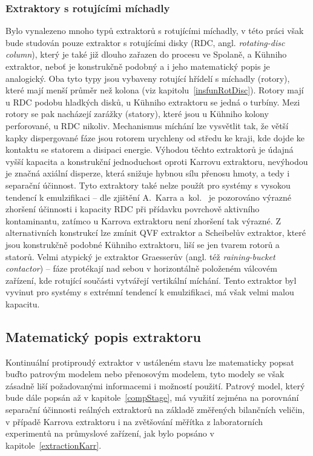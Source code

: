 \subsubsection{Extraktory s rotujícími míchadly} \label{extractionRotDisc}
Bylo vynalezeno mnoho typů extraktorů s rotujícími míchadly, v této práci však bude studován pouze extraktor s rotujícími disky (RDC, angl. \textit{rotating-disc column}), který je také již dlouho zařazen do procesu ve Spolaně, a Kühniho extraktor, neboť je konstrukčně podobný a i jeho matematický popis je analogický.
Oba tyto typy jsou vybaveny rotující hřídelí s míchadly (rotory), které mají menší průměr než kolona (viz kapitolu~\ref{insfunRotDisc}).
Rotory mají u RDC podobu hladkých disků, u Kühniho extraktoru se jedná o turbíny.
Mezi rotory se pak nacházejí zarážky (statory), které jsou u Kühniho kolony perforované, u RDC nikoliv.
Mechanismus míchání lze vysvětlit tak, že větší kapky dispergované fáze jsou rotorem urychleny od středu ke kraji, kde dojde ke kontaktu se statorem a disipaci energie.
Výhodou těchto extraktorů je údajná vyšší kapacita a konstrukční jednoduchost oproti Karrovu extraktoru, nevýhodou je značná axiální disperze, která snižuje hybnou sílu přenosu hmoty, a tedy i separační účinnost.
Tyto extraktory také nelze použít pro systémy s vysokou tendencí k emulzifikaci -- dle zjištění A.~Karra a~kol.~\cite{Karr1990} je pozorováno výrazné zhoršení účinnosti i kapacity RDC při přídavku povrchově aktivního kontaminantu, zatímco u Karrova extraktoru není zhoršení tak výrazné.
Z alternativních konstrukcí lze zmínit QVF extraktor a Scheibelův extraktor, které jsou konstrukčně podobné Kühniho extraktoru, liší se jen tvarem rotorů a statorů.
Velmi atypický je extraktor Graesserův (angl. též \textit{raining-bucket contactor}) -- fáze protékají nad sebou v horizontálně položeném válcovém zařízení, kde rotující součásti vytvářejí vertikální míchání.
Tento extraktor byl vyvinut pro systémy s extrémní tendencí k emulzifikaci, má však velmi malou kapacitu.



\subsection{Matematický popis extraktoru} \label{the_Math}
Kontinuální protiproudý extraktor v ustáleném stavu lze matematicky popsat buďto patrovým modelem nebo přenosovým modelem, tyto modely se však zásadně liší požadovanými informacemi i možností použití.
Patrový model, který bude dále popsán až v kapitole~\ref{compStage}, má využití zejména na porovnání separační účinnosti reálných extraktorů na základě změřených bilančních veličin, v případě Karrova extraktoru i na zvětšování měřítka z laboratorních experimentů na průmyslové zařízení, jak bylo popsáno v kapitole~\ref{extractionKarr}.

